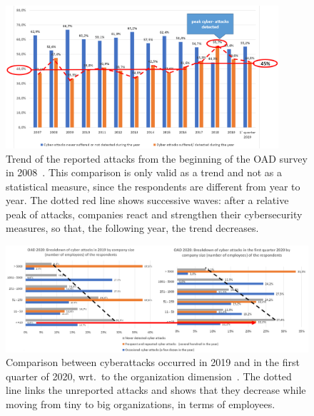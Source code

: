 \documentclass{easychair}
\begin{document}
\begin{figure}
  \centering
  \includegraphics[width=0.9\textwidth]{pictures/fig2.png}
  \caption{Trend of the reported attacks from the beginning of the OAD survey
    in 2008~\cite{oad20}. This comparison is only valid as a trend and not as a statistical
    measure, since the respondents are different from year to year. The dotted red line shows
    successive waves: after a relative peak of attacks, companies react and strengthen
    their cybersecurity measures, so that, the following year, the trend decreases.}
  \label{fig:2}
\end{figure}

\begin{figure}
	\begin{center}
		\includegraphics[scale=0.52]{pictures/fig3.png}
	\end{center}
  \caption{Comparison between cyberattacks occurred in 2019 and in the first quarter of 2020,
    wrt.\ to the organization dimension~\cite{oad20}. The dotted line links
    the unreported attacks and shows that they decrease while moving from tiny to big organizations,
    in terms of employees.}
  \label{fig:3}
\end{figure}
\end{document}
